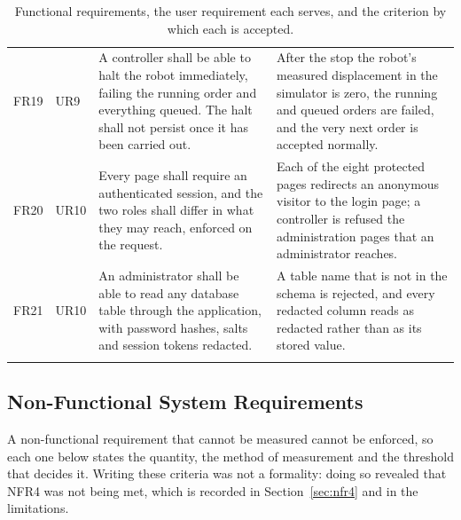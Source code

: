 \documentclass[12pt,a4paper]{report}
\begin{document}
\begin{longtable}{@{}p{}p{}p{}p{}@{}}
FR19 & UR9 & A controller shall be able to halt the robot immediately, failing the running order
and everything queued. The halt shall not persist once it has been carried out. & After the stop
the robot's measured displacement in the simulator is zero, the running and queued orders are
failed, and the very next order is accepted normally. \\
FR20 & UR10 & Every page shall require an authenticated session, and the two roles shall differ in
what they may reach, enforced on the request. & Each of the eight protected pages redirects an
anonymous visitor to the login page; a controller is refused the administration pages that an
administrator reaches. \\
FR21 & UR10 & An administrator shall be able to read any database table through the application,
with password hashes, salts and session tokens redacted. & A table name that is not in the schema
is rejected, and every redacted column reads as redacted rather than as its stored value. \\
\bottomrule
\caption{Functional requirements, the user requirement each serves, and the criterion by which each
is accepted.}
\label{tab:fr}
\end{longtable}

\subsection{Non-Functional System Requirements}
A non-functional requirement that cannot be measured cannot be enforced, so each one below states
the quantity, the method of measurement and the threshold that decides it. Writing these criteria
was not a formality: doing so revealed that NFR4 was not being met, which is recorded in
Section~\ref{sec:nfr4} and in the limitations.
\end{document}
